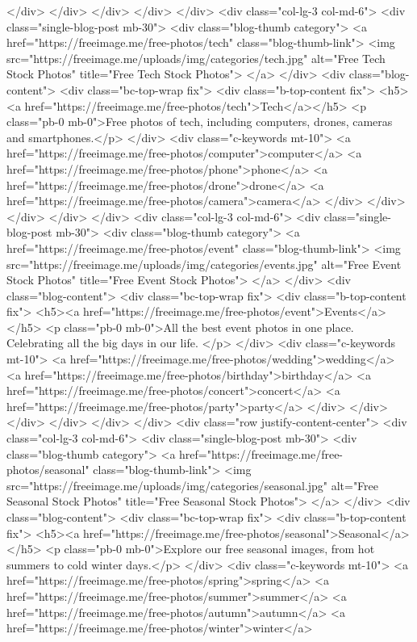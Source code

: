 </div>
</div>
</div>
</div>
</div>
<div class="col-lg-3 col-md-6">
<div class="single-blog-post mb-30">
<div class="blog-thumb category">
<a href="https://freeimage.me/free-photos/tech" class="blog-thumb-link">
<img src="https://freeimage.me/uploads/img/categories/tech.jpg" alt="Free Tech Stock Photos" title="Free Tech Stock Photos">
</a>
</div>
<div class="blog-content">
<div class="bc-top-wrap fix">
<div class="b-top-content fix">
<h5><a href="https://freeimage.me/free-photos/tech">Tech</a></h5>
<p class="pb-0 mb-0">Free photos of tech, including computers, drones, cameras and smartphones.</p>
</div>
<div class="c-keywords mt-10">
<a href="https://freeimage.me/free-photos/computer">computer</a> <a href="https://freeimage.me/free-photos/phone">phone</a> <a href="https://freeimage.me/free-photos/drone">drone</a> <a href="https://freeimage.me/free-photos/camera">camera</a>
</div>
</div>
</div>
</div>
</div>
<div class="col-lg-3 col-md-6">
 <div class="single-blog-post mb-30">
<div class="blog-thumb category">
<a href="https://freeimage.me/free-photos/event" class="blog-thumb-link">
<img src="https://freeimage.me/uploads/img/categories/events.jpg" alt="Free Event Stock Photos" title="Free Event Stock Photos">
</a>
</div>
<div class="blog-content">
<div class="bc-top-wrap fix">
<div class="b-top-content fix">
<h5><a href="https://freeimage.me/free-photos/event">Events</a></h5>
<p class="pb-0 mb-0">All the best event photos in one place. Celebrating all the big days in our life. </p>
</div>
<div class="c-keywords mt-10">
<a href="https://freeimage.me/free-photos/wedding">wedding</a> <a href="https://freeimage.me/free-photos/birthday">birthday</a> <a href="https://freeimage.me/free-photos/concert">concert</a> <a href="https://freeimage.me/free-photos/party">party</a>
</div>
</div>
</div>
</div>
</div>
</div>
<div class="row justify-content-center">
<div class="col-lg-3 col-md-6">
<div class="single-blog-post mb-30">
<div class="blog-thumb category">
<a href="https://freeimage.me/free-photos/seasonal" class="blog-thumb-link">
<img src="https://freeimage.me/uploads/img/categories/seasonal.jpg" alt="Free Seasonal Stock Photos" title="Free Seasonal Stock Photos">
</a>
</div>
<div class="blog-content">
<div class="bc-top-wrap fix">
<div class="b-top-content fix">
<h5><a href="https://freeimage.me/free-photos/seasonal">Seasonal</a></h5>
<p class="pb-0 mb-0">Explore our free seasonal images, from hot summers to cold winter days.</p>
</div>
<div class="c-keywords mt-10">
<a href="https://freeimage.me/free-photos/spring">spring</a> <a href="https://freeimage.me/free-photos/summer">summer</a> <a href="https://freeimage.me/free-photos/autumn">autumn</a> <a href="https://freeimage.me/free-photos/winter">winter</a>
